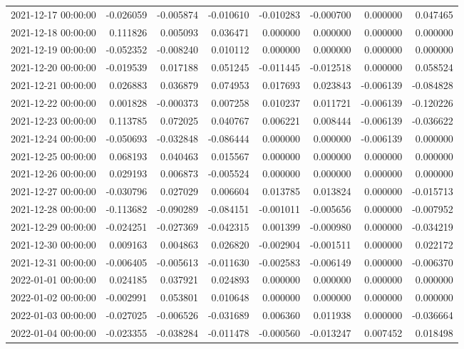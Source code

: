 \begin{tabular}{lrrrrrrr}
2021-12-17 00:00:00 & -0.026059 & -0.005874 & -0.010610 & -0.010283 & -0.000700 & 0.000000 & 0.047465 \\
2021-12-18 00:00:00 & 0.111826 & 0.005093 & 0.036471 & 0.000000 & 0.000000 & 0.000000 & 0.000000 \\
2021-12-19 00:00:00 & -0.052352 & -0.008240 & 0.010112 & 0.000000 & 0.000000 & 0.000000 & 0.000000 \\
2021-12-20 00:00:00 & -0.019539 & 0.017188 & 0.051245 & -0.011445 & -0.012518 & 0.000000 & 0.058524 \\
2021-12-21 00:00:00 & 0.026883 & 0.036879 & 0.074953 & 0.017693 & 0.023843 & -0.006139 & -0.084828 \\
2021-12-22 00:00:00 & 0.001828 & -0.000373 & 0.007258 & 0.010237 & 0.011721 & -0.006139 & -0.120226 \\
2021-12-23 00:00:00 & 0.113785 & 0.072025 & 0.040767 & 0.006221 & 0.008444 & -0.006139 & -0.036622 \\
2021-12-24 00:00:00 & -0.050693 & -0.032848 & -0.086444 & 0.000000 & 0.000000 & -0.006139 & 0.000000 \\
2021-12-25 00:00:00 & 0.068193 & 0.040463 & 0.015567 & 0.000000 & 0.000000 & 0.000000 & 0.000000 \\
2021-12-26 00:00:00 & 0.029193 & 0.006873 & -0.005524 & 0.000000 & 0.000000 & 0.000000 & 0.000000 \\
2021-12-27 00:00:00 & -0.030796 & 0.027029 & 0.006604 & 0.013785 & 0.013824 & 0.000000 & -0.015713 \\
2021-12-28 00:00:00 & -0.113682 & -0.090289 & -0.084151 & -0.001011 & -0.005656 & 0.000000 & -0.007952 \\
2021-12-29 00:00:00 & -0.024251 & -0.027369 & -0.042315 & 0.001399 & -0.000980 & 0.000000 & -0.034219 \\
2021-12-30 00:00:00 & 0.009163 & 0.004863 & 0.026820 & -0.002904 & -0.001511 & 0.000000 & 0.022172 \\
2021-12-31 00:00:00 & -0.006405 & -0.005613 & -0.011630 & -0.002583 & -0.006149 & 0.000000 & -0.006370 \\
2022-01-01 00:00:00 & 0.024185 & 0.037921 & 0.024893 & 0.000000 & 0.000000 & 0.000000 & 0.000000 \\
2022-01-02 00:00:00 & -0.002991 & 0.053801 & 0.010648 & 0.000000 & 0.000000 & 0.000000 & 0.000000 \\
2022-01-03 00:00:00 & -0.027025 & -0.006526 & -0.031689 & 0.006360 & 0.011938 & 0.000000 & -0.036664 \\
2022-01-04 00:00:00 & -0.023355 & -0.038284 & -0.011478 & -0.000560 & -0.013247 & 0.007452 & 0.018498 \\

\end{tabular}
